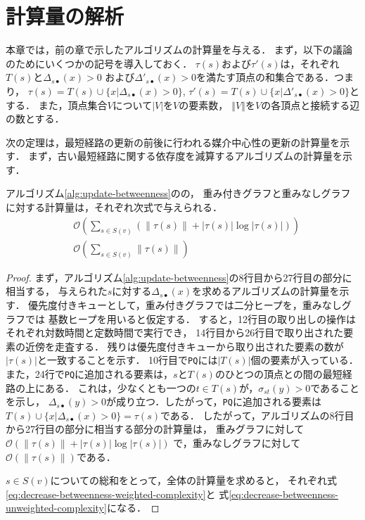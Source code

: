 \chapter{計算量の解析}
\label{chap:complexity-analysis}

本章では，前の章で示したアルゴリズムの計算量を与える．
まず，以下の議論のためにいくつかの記号を導入しておく．
$\tau(s)$および$\tau'(s)$は，それぞれ$T(s)$と$\Delta_{s\bullet}(x)>0$
および$\Delta'_{s\bullet}(x)>0$を満たす頂点の和集合である．つまり，
$\tau(s)=T(s)\cup\{x|\Delta_{s\bullet}(x)>0\}$,
$\tau'(s)=T(s)\cup\{x|\Delta'_{s\bullet}(x)>0\}$とする．
また，頂点集合$V$について$\left\vert V\right\vert$を$V$の要素数，
$\left\Vert V\right\Vert$を$V$の各頂点と接続する辺の数とする．

次の定理は，最短経路の更新の前後に行われる媒介中心性の更新の計算量を示す．
まず，古い最短経路に関する依存度を減算するアルゴリズムの計算量を示す．

\begin{theorem}
  \label{thm:decrease-betweenness-weight-complexity}
  アルゴリズム\ref{alg:update-betweenness}のの，
  重み付きグラフと重みなしグラフに対する計算量は，それぞれ次式で与えられる．
  \begin{align}
    &\mathcal{O}(\sum_{s\in S(v)}\left(\left\|\tau(s)\right\|+\left|\tau(s)\right|\log\left|\tau(s)\right|\right))
    \label{eq:decrease-betweenness-weighted-complexity} \\
    &\mathcal{O}(\sum_{s\in S(v)}\left\|\tau(s)\right\|)
    \label{eq:decrease-betweenness-unweighted-complexity}
  \end{align}
\end{theorem}
\begin{proof}
  まず，アルゴリズム\ref{alg:update-betweenness}の8行目から27行目の部分に相当する，
  与えられた$s$に対する$\Delta_{s\bullet}(x)$を求めるアルゴリズムの計算量を示す．
  優先度付きキューとして，重み付きグラフでは二分ヒープを，重みなしグラフでは
  基数ヒープを用いると仮定する．
  すると，12行目の取り出しの操作はそれぞれ対数時間と定数時間で実行でき，
  14行目から26行目で取り出された要素の近傍を走査する．
  残りは優先度付きキューから取り出された要素の数が$|\tau(s)|$と一致することを示す．
  10行目で\texttt{PQ}には$|T(s)|$個の要素が入っている．
  また，24行で\texttt{PQ}に追加される要素は，$s$と$T(s)$のひとつの頂点との間の最短経路の上にある．
  これは，少なくとも一つの$t\in T(s)$が，$\sigma_{st}(y)>0$であることを示し，
  $\Delta_{s\bullet}(y)>0$が成り立つ．したがって，\texttt{PQ}に追加される要素は
  $T(s)\cup\{x|\Delta_{s\bullet}(x)>0\}=\tau(s)$である．
  したがって，アルゴリズムの8行目から27行目の部分に相当する部分の計算量は，
  重みグラフに対して$\mathcal{O}(\|\tau(s)\|+|\tau(s)|\log|\tau(s)|)$
  で，重みなしグラフに対して$\mathcal{O}(\|\tau(s)\|)$である．

  $s\in S(v)$についての総和をとって，全体の計算量を求めると，
  それぞれ式\eqref{eq:decrease-betweenness-weighted-complexity}と
  式\eqref{eq:decrease-betweenness-unweighted-complexity}になる．
\end{proof}

